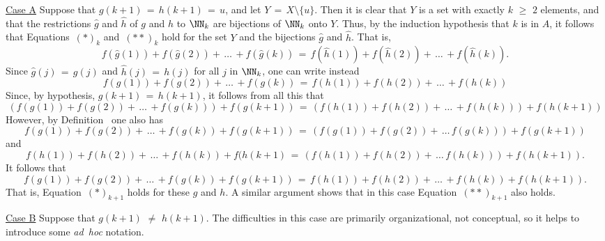 {        \underline{Case A} Suppose that $g(k+1) \,=\, h(k+1) \,=\, u$, and let $Y \,=\, X{\setminus}\{u\}$.
    Then it is clear that $Y$ is a set with exactly $k\,\,{\geq}\,\,2$ elements, and that the restrictions $\hat{g}$ and $\hat{h}$ of $g$ and $h$ to ${\NN}_{k}$ are bijections of ${\NN}_{k}$ onto $Y$.
    Thus, by the induction hypothesis that $k$ is in $A$, it follows that Equations~$({\ast})_{k}$ and~$({\ast}{\ast})_{k}$ hold for the set $Y$ and the bijections $\hat{g}$ and $\hat{h}$. That is,
        \begin{displaymath}
        f(\hat{g}(1)) + f(\hat{g}(2)) + \,{\ldots}\,+f(\hat{g}(k)) \,=\, 
        f(\hat{h}(1)) + f(\hat{h}(2)) + \,{\ldots}\,+f(\hat{h}(k)).
        \end{displaymath}
    Since $\hat{g}(j) \,=\, g(j)$ and $\hat{h}(j) \,=\, h(j)$ for all $j$ in ${\NN}_{k}$,
    one can write instead
        \begin{displaymath}
        f(g(1)) + f(g(2)) + \,{\ldots}\,+f(g(k)) \,=\, 
        f(h(1)) + f(h(2)) + \,{\ldots}\,+f(h(k))
        \end{displaymath}
    Since, by hypothesis, $g(k+1) \,=\, h(k+1)$, it follows from all this that
        \begin{displaymath}
        (f(g(1)) + f(g(2)) + \,{\ldots}\,+f(g(k)))+f(g(k+1)) \,=\, 
        (f(h(1)) + f(h(2)) + \,{\ldots}\,+f(h(k)))+f(h(k+1))
        \end{displaymath}
        However, by Definition~ one also has
        \begin{displaymath}
        f(g(1)) + f(g(2)) + \,{\ldots}\,+ f(g(k)) + f(g(k+1)) \,=\,
        (f(g(1)) + f(g(2)) + \,{\ldots}\,f(g(k))) + f(g(k+1))
        \end{displaymath}
    and
        \begin{displaymath}
        f(h(1)) + f(h(2)) + \,{\ldots}\,+ f(h(k)) + f(h(k+1) \,=\,
        (f(h(1)) + f(h(2)) + \,{\ldots}\,f(h(k))) + f(h(k+1)).
        \end{displaymath}
    It follows that
        \begin{displaymath}
        f(g(1)) + f(g(2)) + \,{\ldots}\,+f(g(k))+f(g(k+1)) \,=\,
        f(h(1)) + f(h(2)) + \,{\ldots}\,+f(h(k))+f(h(k+1)).
        \end{displaymath}
    That is, Equation~$({\ast})_{k+1}$ holds for these $g$ and $h$. A similar argument shows that in this case Equation~$({\ast}{\ast})_{k+1}$ also holds.

\V

        \underline{Case B} Suppose that $g(k+1) \,\,{\neq}\,\, h(k+1)$. The difficulties in this case are primarily organizational, not conceptual, so it helps to introduce some {\em ad~hoc} notation.

}
